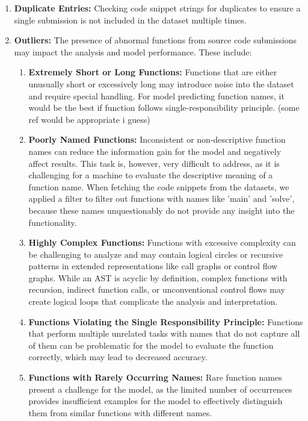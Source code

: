 \documentclass[10pt,english,a4paper]{report}
\begin{document}
\begin{enumerate}
    \item \textbf{Duplicate Entries:} 
    \label{item:duplicate_entries}
    Checking code snippet strings for duplicates to ensure a single submission is not included in the dataset multiple times.

    \item \textbf{Outliers:} 
    \label{item:outliers}
    The presence of abnormal functions from source code submissions may impact the analysis and model performance. These include:
    \begin{enumerate}
        \item \textbf{Extremely Short or Long Functions:} 
        \label{item:short_long_functions}
        Functions that are either unusually short or excessively long may introduce noise into the dataset and require special handling. For model predicting function names, it would be the best if function follows single-responsibility principle. (some ref would be appropriate i guess)
        
        \item \textbf{Poorly Named Functions:} 
        \label{item:poorly_named_functions}
        Inconsistent or non-descriptive function names can reduce the information gain for the model and negatively affect results. This task is, however, very difficult to address, as it is challenging for a machine to evaluate the descriptive meaning of a function name. When fetching the code snippets from the datasets, we applied a filter to filter out functions with names like 'main' and 'solve', because these names unquestionably do not provide any insight into the functionality.

        \item \textbf{Highly Complex Functions:} 
        \label{item:complex_functions}
        Functions with excessive complexity can be challenging to analyze and may contain logical circles or recursive patterns in extended representations like call graphs or control flow graphs. While an AST is acyclic by definition, complex functions with recursion, indirect function calls, or unconventional control flows may create logical loops that complicate the analysis and interpretation.

        \item \textbf{Functions Violating the Single Responsibility Principle:} 
        \label{item:single_responsibility}
        Functions that perform multiple unrelated tasks with names that do not capture all of them can be problematic for the model to evaluate the function correctly, which may lead to decreased accuracy.

        \item \textbf{Functions with Rarely Occurring Names:} 
        \label{item:rare_names}
        Rare function names present a challenge for the model, as the limited number of occurrences provides insufficient examples for the model to effectively distinguish them from similar functions with different names.
    \end{enumerate}
\end{enumerate}
\end{document}
